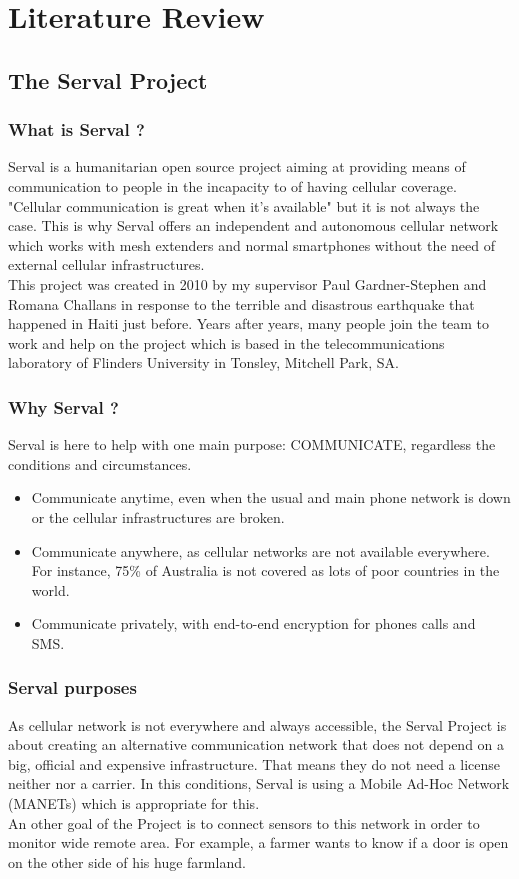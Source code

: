 \chapter{Literature Review}

\section{The Serval Project}

\subsection{What is Serval ?}
Serval is a humanitarian open source project aiming at providing means of communication to people in the incapacity to of having cellular coverage. "Cellular communication is great when it's available" but it is not always the case. This is why Serval offers an independent and autonomous cellular network which works with mesh extenders and normal smartphones without the need of external cellular infrastructures. \\
This project was created in 2010 by my supervisor Paul Gardner-Stephen and Romana Challans in response to the terrible and disastrous earthquake that happened in Haiti just before. Years after years, many people join the team to work and help on the project which is based in the telecommunications laboratory of Flinders University in Tonsley, Mitchell Park, SA. 


\subsection{Why Serval ?}
Serval is here to help with one main purpose: COMMUNICATE, regardless the conditions and circumstances.
\begin{itemize}
\item Communicate anytime, even when the usual and main phone network is down or the cellular infrastructures are broken.
\item Communicate anywhere, as cellular networks are not available everywhere. For instance, 75\% of Australia is not covered as lots of poor countries in the world. 
\item Communicate privately, with end-to-end encryption for phones calls and SMS.
\end{itemize}

\subsection{Serval purposes}
As cellular network is not everywhere and always accessible, the Serval Project is about creating an alternative communication network that does not depend on a big, official and expensive infrastructure. That means they do not need a license neither nor a carrier. In this conditions, Serval is using a Mobile Ad-Hoc Network (MANETs) which is appropriate for this. \\
An other goal of the Project is to connect sensors to this network in order to monitor wide remote area. For example, a farmer wants to know if a door is open on the other side of his huge farmland. 


